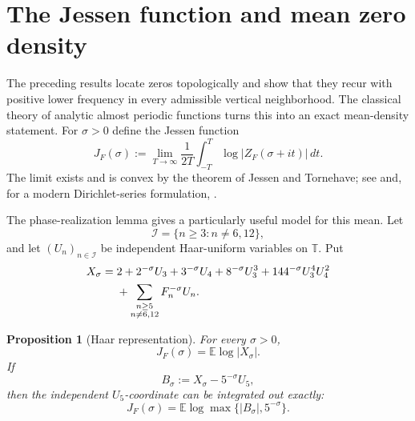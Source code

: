 \documentclass[11pt]{article}
\newtheorem{proposition}[theorem]{Proposition}
\theoremstyle{remark}
\newcommand{\T}{\mathbb T}
\newcommand{\ZF}{Z_F}
\newcommand{\JF}{J_F}
\begin{document}
\section{The Jessen function and mean zero density}\label{sec:jessen}

The preceding results locate zeros topologically and show that they recur with positive lower frequency in every admissible vertical neighborhood.  The classical theory of analytic almost periodic functions turns this into an exact mean-density statement.  For $\sigma>0$ define the Jessen function
\begin{equation}\label{eq:jessen}
\JF(\sigma)
:=\lim_{T\to\infty}\frac1{2T}\int_{-T}^{T}
\log|\ZF(\sigma+it)|\,dt.
\end{equation}
The limit exists and is convex by the theorem of Jessen and Tornehave; see \cite{Jessen1933,JessenTornehave1945} and, for a modern Dirichlet-series formulation, \cite{KouroupisPerfekt2023}.

The phase-realization lemma gives a particularly useful model for this mean.  Let
\[
\mathcal I=\{n\ge3:n\ne6,12\},
\]
and let $(U_n)_{n\in\mathcal I}$ be independent Haar-uniform variables on $\T$.  Put
\begin{align}\label{eq:random-model}
X_\sigma={}&2+2^{-\sigma}U_3+3^{-\sigma}U_4
+8^{-\sigma}U_3^3+144^{-\sigma}U_3^4U_4^2\\
&+\sum_{\substack{n\ge5\\n\ne6,12}}F_n^{-\sigma}U_n.\notag
\end{align}

\begin{proposition}[Haar representation]\label{prop:haar-jessen}
For every $\sigma>0$,
\begin{equation}\label{eq:haar-jessen}
\JF(\sigma)=\mathbb E\log|X_\sigma|.
\end{equation}
If
\[
B_\sigma:=X_\sigma-5^{-\sigma}U_5,
\]
then the independent $U_5$-coordinate can be integrated out exactly:
\begin{equation}\label{eq:conditional-jensen}
\JF(\sigma)
=\mathbb E\log\max\{|B_\sigma|,5^{-\sigma}\}.
\end{equation}
\end{proposition}
\end{document}
